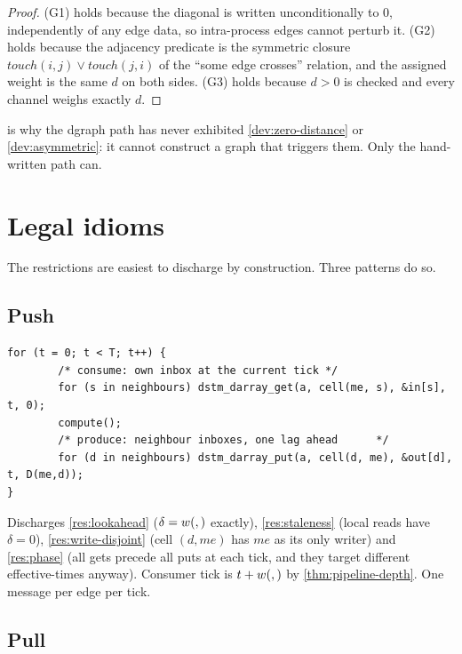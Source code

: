 \begin{proof}
(G1) holds because the diagonal is written unconditionally to $0$,
independently of any edge data, so intra-process edges cannot perturb it.
(G2) holds because the adjacency predicate is the symmetric closure
$\mathit{touch}(i,j) \vee \mathit{touch}(j,i)$ of the ``some edge crosses''
relation, and the assigned weight is the same $d$ on both sides. (G3) holds
because $d > 0$ is checked and every channel weighs exactly $d$.

\end{proof}

 is why the dgraph path has never exhibited
\cref{dev:zero-distance} or \cref{dev:asymmetric}: it cannot construct a graph
that triggers them. Only the hand-written  path
can.

\section{Legal idioms}
\label{sec:api-idioms}

The restrictions are easiest to discharge by construction. Three patterns do
so.

\subsection*{Push}

\begin{lstlisting}
for (t = 0; t < T; t++) {
        /* consume: own inbox at the current tick */
        for (s in neighbours) dstm_darray_get(a, cell(me, s), &in[s], t, 0);
        compute();
        /* produce: neighbour inboxes, one lag ahead      */
        for (d in neighbours) dstm_darray_put(a, cell(d, me), &out[d], t, D(me,d));
}
\end{lstlisting}

Discharges \cref{res:lookahead} ($\delta = w(,)$ exactly),
\cref{res:staleness} (local reads have $\delta = 0$),
\cref{res:write-disjoint} (cell $(d, \mathit{me})$ has $\mathit{me}$ as its
only writer) and \cref{res:phase} (all \glspl{get} precede all \glspl{put} at each tick, and
they target different \glspl{effective-time} anyway). Consumer tick is
$t + w(,)$ by \cref{thm:pipeline-depth}. One message per edge per tick.

\subsection*{Pull}

